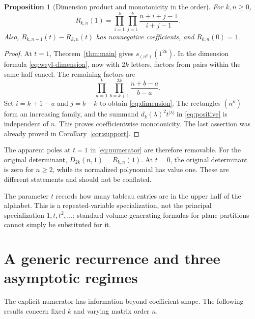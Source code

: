 \documentclass[11pt,a4paper]{article}
\newtheorem{proposition}[theorem]{Proposition}
\theoremstyle{definition}
\theoremstyle{remark}
\numberwithin{equation}{section}
\begin{document}
\begin{proposition}[Dimension product and monotonicity in the order]
\label{prop:dimension}
For \(k,n\ge0\),
\begin{equation}
 R_{k,n}(1)=\prod_{i=1}^{k}\prod_{j=1}^{k}
 \frac{n+i+j-1}{i+j-1}.
 \label{eq:dimension}
\end{equation}
Also, \(R_{k,n+1}(t)-R_{k,n}(t)\) has nonnegative coefficients, and
\(R_{k,n}(0)=1\).
\end{proposition}
\begin{proof}
At \(t=1\), Theorem~\ref{thm:main} gives
\(s_{(n^k)}(1^{2k})\). In the dimension formula
\eqref{eq:weyl-dimension}, now with \(2k\) letters, factors from pairs
within the same half cancel. The remaining factors are
\[
 \prod_{a=1}^{k}\prod_{b=k+1}^{2k}\frac{n+b-a}{b-a}.
\]
Set \(i=k+1-a\) and \(j=b-k\) to obtain \eqref{eq:dimension}.
The rectangles \((n^k)\) form an increasing family, and the summand
\(d_k(\lambda)^2t^{|\lambda|}\) in \eqref{eq:positive} is independent
of \(n\). This proves coefficientwise monotonicity. The last assertion
was already proved in Corollary~\ref{cor:support}.
\end{proof}

The apparent poles at \(t=1\) in \eqref{eq:numerator} are therefore
removable. For the original determinant,
\(D_{2k}(n,1)=R_{k,n}(1)\). At \(t=0\), the original determinant is zero
for \(n\ge2\), while its normalized polynomial has value one. These are
different statements and should not be conflated.

The parameter \(t\) records how many tableau entries are in the upper
half of the alphabet. This is a repeated-variable specialization, not the
principal specialization \(1,t,t^2,\ldots\); standard volume-generating
formulas for plane partitions cannot simply be substituted for it.

\section{A generic recurrence and three asymptotic regimes}
\label{sec:recurrence}
The explicit numerator has information beyond coefficient shape. The
following results concern fixed \(k\) and varying matrix order \(n\).
\end{document}
